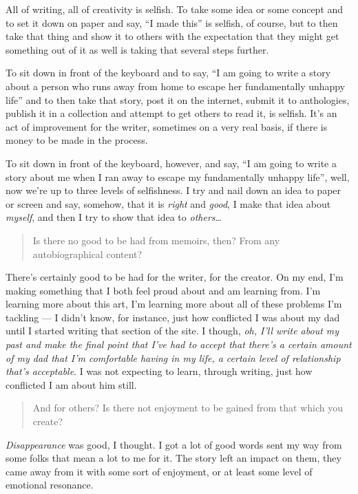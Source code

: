 All of writing, all of creativity is selfish. To take some idea or some concept and to set it down on paper and say, ``I made this'' is selfish, of course, but to then take that thing and show it to others with the expectation that they might get something out of it as well is taking that several steps further.

To sit down in front of the keyboard and to say, ``I am going to write a story about a person who runs away from home to escape her fundamentally unhappy life'' and to then take that story, post it on the internet, submit it to anthologies, publish it in a collection and attempt to get others to read it, is selfish. It's an act of improvement for the writer, sometimes on a very real basis, if there is money to be made in the process.

To sit down in front of the keyboard, however, and say, ``I am going to write a story about me when I ran away to escape my fundamentally unhappy life'', well, now we're up to three levels of selfishness. I try and nail down an idea to paper or screen and say, somehow, that it is \emph{right} and \emph{good}, I make that idea about \emph{myself}, and then I try to show that idea to \emph{others}\ldots{}

\begin{quote}
Is there no good to be had from memoirs, then? From any autobiographical content?
\end{quote}

There's certainly good to be had for the writer, for the creator. On my end, I'm making something that I both feel proud about and am learning from. I'm learning more about this art, I'm learning more about all of these problems I'm tackling --- I didn't know, for instance, just how conflicted I was about my dad until I started writing that section of the site. I though, \emph{oh, I'll write about my past and make the final point that I've had to accept that there's a certain amount of my dad that I'm comfortable having in my life, a certain level of relationship that's acceptable}. I was not expecting to learn, through writing, just how conflicted I am about him still.

\begin{quote}
And for others? Is there not enjoyment to be gained from that which you create?
\end{quote}

\emph{Disappearance} was good, I thought. I got a lot of good words sent my way from some folks that mean a lot to me for it. The story left an impact on them, they came away from it with some sort of enjoyment, or at least some level of emotional resonance.


